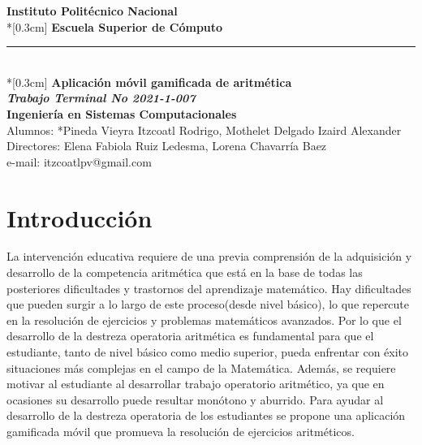 \documentclass{article}
\begin{document}
\begin{titlepage}


        \begin{center}
            \LARGE \textbf{Instituto Politécnico Nacional}\\*[0.3cm]
            \Large \textbf{Escuela Superior de Cómputo}\\
            \vspace{1cm}
            \rule{12cm}{0.5mm}\\*[0.3cm]%
            \hspace{0.9cm} 
    		\LARGE \textbf{ Aplicación móvil gamificada de aritmética\\}
    		\LARGE \textbf {\emph{Trabajo Terminal No 2021-1-007}} 
    		\vspace{1cm} %
    	\LARGE \textbf{\\ Ingeniería en Sistemas Computacionales\\}
    	Alumnos: *Pineda Vieyra Itzcoatl Rodrigo, Mothelet Delgado Izaird Alexander\\
	Directores: Elena Fabiola Ruiz Ledesma, Lorena Chavarría Baez\\
	e-mail: itzcoatlpv@gmail.com
    \vspace{1cm} %
        \end{center}

    \centering %
    \vspace{1cm} %

   	


\end{titlepage}

\tableofcontents
\pagebreak
\section{Introducción}
La intervención educativa requiere de una previa comprensión de la adquisición y desarrollo de la competencia aritmética
que está en la base de todas las posteriores dificultades y trastornos del aprendizaje matemático. Hay dificultades que
pueden surgir a lo largo de este proceso(desde nivel básico), lo que repercute en la resolución de ejercicios y problemas matemáticos avanzados.
Por lo que el desarrollo de la destreza operatoria aritmética es fundamental para que el estudiante, tanto de nivel básico como medio superior, pueda enfrentar con
éxito situaciones más complejas en el campo de la Matemática. Además, se requiere motivar al estudiante al desarrollar
trabajo operatorio aritmético, ya que en ocasiones su desarrollo puede resultar monótono y aburrido. Para ayudar al desarrollo de la destreza operatoria de los estudiantes se propone una aplicación gamificada móvil que promueva la
resolución de ejercicios aritméticos.
\end{document}
